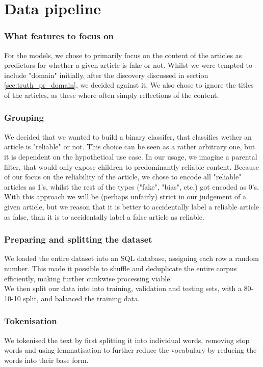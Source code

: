 \section*{Data pipeline}
\subsubsection{What features to focus on}
For the models, we chose to primarily focus on the content of the articles as predictors for whether a given article is
fake or not. Whilst we were tempted to include "domain" initially, after the discovery discussed in section \ref{sec:truth_pr_domain},
we decided against it. We also chose to ignore the titles of the articles, as these where often simply reflections of the
content.

\subsubsection{Grouping}
We decided that we wanted to build a binary classifer, that classifies wether an article is "reliable" or not. This choice can be seen as a rather arbitrary one, but it is dependent on the hypothetical use case. In our usage, we imagine a parental filter, that would only expose children to predominantly reliable content. Because of our focus on the reliability of
the article, we chose to encode all "reliable" articles as 1's, whilst the rest of the types ("fake", "bias", etc.) got
encoded as 0's. With this approach we will be (perhaps unfairly) strict in our judgement of a given article, but we
reason that it is better to accidentally label a reliable article as false, than it is to accidentally label a false
article as reliable.

\subsubsection{Preparing and splitting the dataset}
We loaded the entire dataset into an SQL database, assigning each row a random number. This made it possible to shuffle and deduplicate the entire corpus efficiently, making further cunkwise processing viable.\\
We then split our data into into training, validation and testing sets, with a 80-10-10 split, and balanced the training data.

\subsubsection{Tokenisation}
We tokenised the text by first splitting it into
individual words, removing stop words and using lemmatisation to further reduce the vocabulary by reducing the words into
their base form.

